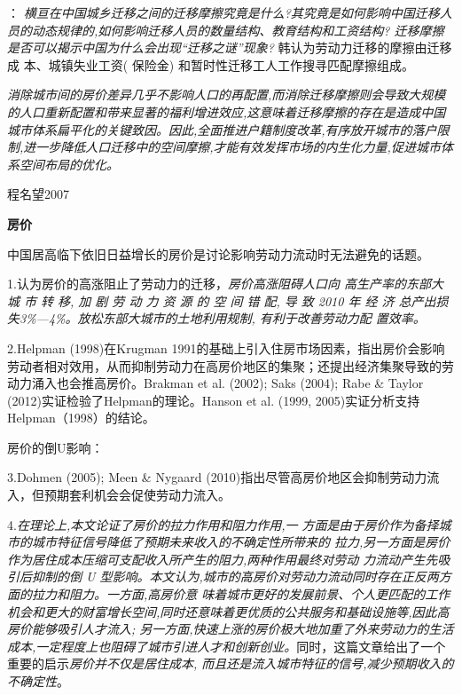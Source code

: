 \documentclass[a4paper,12pt]{article}
\begin{document}
\cite{HanQiHengNongCunLaoDongLiQianYiMoCaYingXiangNongMinGongShuLiangYuGongZiJieGouMa2018}：
\textit{横亘在中国城乡迁移之间的迁移摩擦究竟是什么?其究竟是如何影响中国迁移人员的动态规律的,如何影响迁移人员的数量结构、教育结构和工资结构? 迁移摩擦是否可以揭示中国为什么会出现“迁移之谜”现象?}
韩认为劳动力迁移的摩擦由迁移成 本、城镇失业工资( 保险金) 和暂时性迁移工人工作搜寻匹配摩擦组成。

\cite{LiuXiuYanFangJieQianYiMoCaYuZhongGuoChengShiDeGuiMoFenBuLiLunMoXingYuJieGouShiGuJi2017}
\textit{消除城市间的房价差异几乎不影响人口的再配置,而消除迁移摩擦则会导致大规模的人口重新配置和带来显著的福利增进效应,这意味着迁移摩擦的存在是造成中国城市体系扁平化的关键致因。因此,全面推进户籍制度改革,有序放开城市的落户限制,进一步降低人口迁移中的空间摩擦,才能有效发挥市场的内生化力量,促进城市体系空间布局的优化。}


程名望2007







\textbf{房价}

中国居高临下依旧日益增长的房价是讨论影响劳动力流动时无法避免的话题。

1.\cite{WangLiLiTuDiGongGeiFangJieYuLaoDongLiKongJianPeiZhiXiaoLu2023}认为房价的高涨阻止了劳动力的迁移，\textit{房价高涨阻碍人口向 高生产率的东部大 城 市 转 移, 加 剧 劳 动 力 资 源 的 空 间 错 配, 导 致 2010 年 经 济 总产出损失3\%—4\%。放松东部大城市的土地利用规制, 有利于改善劳动力配 置效率。}

2.Helpman (1998)在Krugman 1991的基础上引入住房市场因素，指出房价会影响劳动者相对效用，从而抑制劳动力在高房价地区的集聚；还提出经济集聚导致的劳动力涌入也会推高房价。Brakman et al. (2002); Saks (2004); Rabe \& Taylor (2012)实证检验了Helpman的理论。Hanson et al. (1999, 2005)实证分析支持Helpman（1998）的结论。

房价的倒U影响：

3.Dohmen (2005); Meen \& Nygaard (2010)指出尽管高房价地区会抑制劳动力流入，但预期套利机会会促使劳动力流入。

4.\cite{ZhangLiFangJieRuHeYingXiangLaoDongLiLiuDong2017}\textit{在理论上,本文论证了房价的拉力作用和阻力作用,一 方面是由于房价作为备择城市的城市特征信号降低了预期未来收入的不确定性所带来的 拉力,另一方面是房价作为居住成本压缩可支配收入所产生的阻力,两种作用最终对劳动 力流动产生先吸引后抑制的倒 U 型影响。本文认为,城市的高房价对劳动力流动同时存在正反两方面的拉力和阻力。一方面,高房价意  味着城市更好的发展前景、个人更匹配的工作机会和更大的财富增长空间,同时还意味着更优质的公共服务和基础设施等,因此高房价能够吸引人才流入; 另一方面,快速上涨的房价极大地加重了外来劳动力的生活成本,一定程度上也阻碍了城市引进人才和创新创业。}同时，这篇文章给出了一个重要的启示\textit{房价并不仅是居住成本, 而且还是流入城市特征的信号,减少预期收入的不确定性}。
\end{document}
